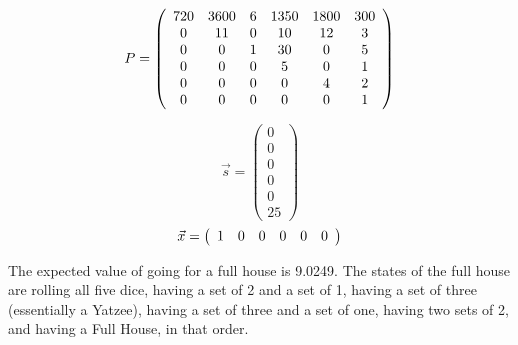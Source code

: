 \[
P=
\left(
\begin{array}{c c c c c c}
720 & 3600 & 6 & 1350 & 1800 & 300\\
0 & 11 & 0 & 10 & 12 & 3\\
0 & 0 & 1 & 30 & 0 & 5\\
0 & 0 & 0 & 5 & 0 & 1\\
0 & 0 & 0 & 0 & 4 & 2\\
0 & 0 & 0 & 0 & 0 & 1\\
\end{array}
\right)
\]

\[
\vec{s}=
\left(
\begin{array}{c}
0\\
0\\
0\\
0\\
0\\
25
\end{array}
\right)
\]
\[
\vec{x}=
\left(
\begin{array}{c c c c c c}
1&0&0&0&0&0
\end{array}
\right)
\]

The expected value of going for a full house is 9.0249. The states of the full
house are rolling all five dice, having a set of 2 and a set of 1, having a set
of three (essentially a Yatzee), having a set of three and a set of one, having
two sets of 2, and having a Full House, in that order.
